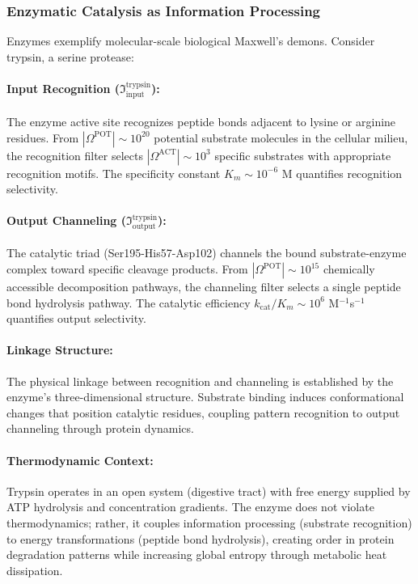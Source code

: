 \subsubsection{Enzymatic Catalysis as Information Processing}

Enzymes exemplify molecular-scale biological Maxwell's demons. Consider trypsin, a serine protease:

\paragraph{Input Recognition (\(\Im_{\text{input}}^{\text{trypsin}}\)):}
The enzyme active site recognizes peptide bonds adjacent to lysine or arginine residues. From \(|\Omega^{\text{POT}}| \sim 10^{20}\) potential substrate molecules in the cellular milieu, the recognition filter selects \(|\Omega^{\text{ACT}}| \sim 10^{3}\) specific substrates with appropriate recognition motifs. The specificity constant \(K_m \sim 10^{-6}\) M quantifies recognition selectivity.

\paragraph{Output Channeling (\(\Im_{\text{output}}^{\text{trypsin}}\)):}
The catalytic triad (Ser195-His57-Asp102) channels the bound substrate-enzyme complex toward specific cleavage products. From \(|\Omega^{\text{POT}}| \sim 10^{15}\) chemically accessible decomposition pathways, the channeling filter selects a single peptide bond hydrolysis pathway. The catalytic efficiency \(k_{\text{cat}}/K_m \sim 10^{6}\) M\(^{-1}\)s\(^{-1}\) quantifies output selectivity.

\paragraph{Linkage Structure:}
The physical linkage between recognition and channeling is established by the enzyme's three-dimensional structure. Substrate binding induces conformational changes that position catalytic residues, coupling pattern recognition to output channeling through protein dynamics.

\paragraph{Thermodynamic Context:}
Trypsin operates in an open system (digestive tract) with free energy supplied by ATP hydrolysis and concentration gradients. The enzyme does not violate thermodynamics; rather, it couples information processing (substrate recognition) to energy transformations (peptide bond hydrolysis), creating order in protein degradation patterns while increasing global entropy through metabolic heat dissipation.

